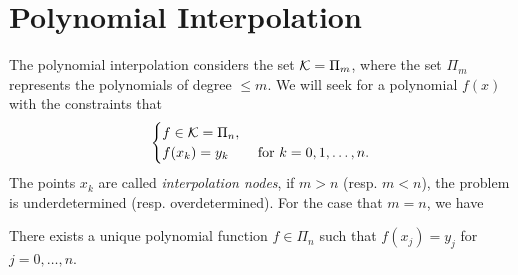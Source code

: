 \section{Polynomial Interpolation}
\label{Sec: 2-Pol-Int}
The polynomial interpolation considers the set $\mathcal K = \Pi_m$, where the set $\Pi_m$ represents the polynomials of degree $ \le m$. We will seek for a polynomial $f(x)$ with the constraints that
\begin{equation}\nonumber
    \begin{cases}
        f\in \mathcal K = \Pi_n,&\\
        f(x_k) = y_k &\text{ for } k = 0, 1,\dots, n.
    \end{cases}
\end{equation}
The points $x_k$ are called \emph{interpolation nodes}, if $m > n$ (resp. $m < n$), the problem is underdetermined (resp. overdetermined). For the case that $ m = n$, we have
\begin{theorem}
\label{Thm: 2-Uni-Exi}
    There exists a unique polynomial function $f\in \Pi_n$ such that $f(x_j) = y_j$ for $j=0,\dots, n$.
\end{theorem}
